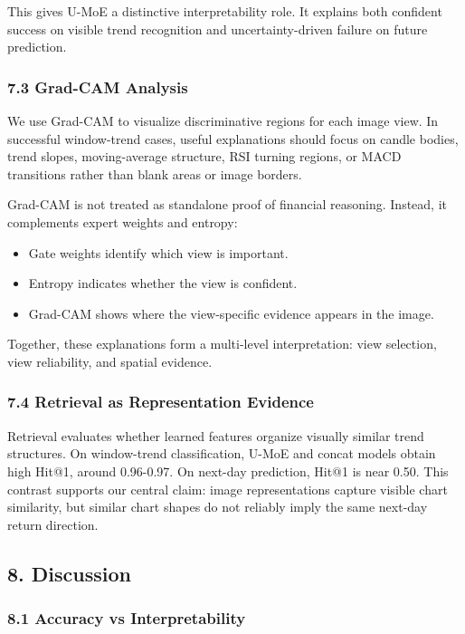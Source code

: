 \documentclass[
]{article}
\providecommand{\tightlist}{%
  \setlength{\itemsep}{0pt}\setlength{\parskip}{0pt}}
\begin{document}
This gives U-MoE a distinctive interpretability role. It explains both
confident success on visible trend recognition and uncertainty-driven
failure on future prediction.

\subsubsection{7.3 Grad-CAM Analysis}\label{grad-cam-analysis}

We use Grad-CAM to visualize discriminative regions for each image view.
In successful window-trend cases, useful explanations should focus on
candle bodies, trend slopes, moving-average structure, RSI turning
regions, or MACD transitions rather than blank areas or image borders.

Grad-CAM is not treated as standalone proof of financial reasoning.
Instead, it complements expert weights and entropy:

\begin{itemize}
\tightlist
\item
  Gate weights identify which view is important.
\item
  Entropy indicates whether the view is confident.
\item
  Grad-CAM shows where the view-specific evidence appears in the image.
\end{itemize}

Together, these explanations form a multi-level interpretation: view
selection, view reliability, and spatial evidence.

\subsubsection{7.4 Retrieval as Representation
Evidence}\label{retrieval-as-representation-evidence}

Retrieval evaluates whether learned features organize visually similar
trend structures. On window-trend classification, U-MoE and concat
models obtain high Hit@1, around 0.96-0.97. On next-day prediction,
Hit@1 is near 0.50. This contrast supports our central claim: image
representations capture visible chart similarity, but similar chart
shapes do not reliably imply the same next-day return direction.

\subsection{8. Discussion}\label{discussion}

\subsubsection{8.1 Accuracy vs
Interpretability}\label{accuracy-vs-interpretability}
\end{document}
